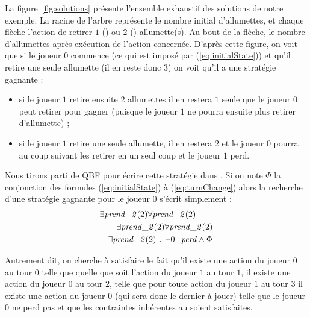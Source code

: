 La figure~\ref{fig:solutions} présente l'ensemble exhaustif des solutions de notre exemple. La racine de l'arbre représente le nombre initial d'allumettes, et chaque flèche l'action de retirer $1$ () ou $2$ () allumette(s). Au bout de la flèche, le nombre d'allumettes après exécution de l'action concernée. D'après cette figure, on voit que si le joueur $0$ commence (ce qui est imposé par (\ref{eq:initialState})) et qu'il retire une seule allumette (il en reste donc 3) on voit qu'il a une stratégie gagnante : 
\begin{itemize}
\item si le joueur $1$ retire ensuite $2$ allumettes il en restera $1$ seule que le joueur $0$ peut retirer pour gagner (puisque le joueur $1$ ne pourra ensuite plus retirer d'allumette) ;

\item si le joueur $1$ retire une seule allumette, il en restera  $2$ et le joueur $0$ pourra au coup suivant les retirer en un seul coup et le joueur $1$ perd.
\end{itemize}

Nous tirons parti de QBF pour écrire cette stratégie dans \touist. Si on note $\Phi$ la conjonction des formules (\ref{eq:initialState}) à (\ref{eq:turnChange}) alors la recherche d'une stratégie gagnante pour le joueur $0$ s'écrit simplement :
\vspace{-0.2cm}
\begin{align}
\begin{split}
&\exists \takes{0}
\forall \takes{1}\\
&\qquad\exists \takes{2}
\forall \takes{3} \\
&\quad\exists \takes{4}\text{ . }\neg \lost \land \Phi
\end{split}
\end{align}

\noindent
Autrement dit, on cherche à satisfaire le fait qu'il existe une action du joueur $0$ au tour $0$ telle que quelle que soit l'action du joueur $1$ au tour $1$, il existe une action du joueur $0$ au tour $2$, telle que pour toute action du joueur $1$ au tour $3$ il existe une action du joueur $0$ (qui sera donc le dernier à jouer) telle que le joueur $0$ ne perd pas et que les contraintes inhérentes au \game soient satisfaites.


